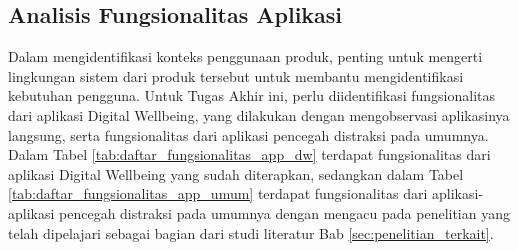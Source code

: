 \subsection{Analisis Fungsionalitas Aplikasi}
\label{subsec:analisis_fungsionalitas}

Dalam mengidentifikasi konteks penggunaan produk, penting untuk mengerti lingkungan sistem dari produk tersebut untuk membantu mengidentifikasi kebutuhan pengguna. Untuk Tugas Akhir ini, perlu diidentifikasi fungsionalitas dari aplikasi Digital Wellbeing, yang dilakukan dengan mengobservasi aplikasinya langsung, serta fungsionalitas dari aplikasi pencegah distraksi pada umumnya. Dalam Tabel \ref{tab:daftar_fungsionalitas_app_dw} terdapat fungsionalitas dari aplikasi Digital Wellbeing yang sudah diterapkan, sedangkan dalam Tabel \ref{tab:daftar_fungsionalitas_app_umum} terdapat fungsionalitas dari aplikasi-aplikasi pencegah distraksi pada umumnya dengan mengacu pada penelitian yang telah dipelajari sebagai bagian dari studi literatur Bab \ref{sec:penelitian_terkait}.

